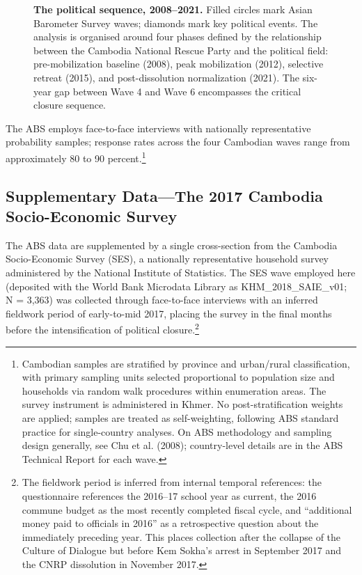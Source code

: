 \documentclass[Review,times,sageh,doublespace]{sagej}
\begin{document}
\begin{figure}[!htbp]
{%
}%
\caption{\textbf{The political sequence, 2008--2021.}
Filled circles mark Asian Barometer Survey waves; diamonds mark key political events.
The analysis is organised around four phases defined by the relationship between the
Cambodia National Rescue Party and the political field: pre-mobilization baseline (2008),
peak mobilization (2012), selective retreat (2015), and post-dissolution normalization (2021).
The six-year gap between Wave 4 and Wave 6 encompasses the critical closure sequence.}
\label{fig:timeline}
\end{figure}

The ABS employs face-to-face interviews with nationally representative
probability samples; response rates across the four Cambodian waves
range from approximately 80 to 90 percent.\footnote{Cambodian samples
  are stratified by province and urban/rural classification, with
  primary sampling units selected proportional to population size and
  households via random walk procedures within enumeration areas. The
  survey instrument is administered in Khmer. No post-stratification
  weights are applied; samples are treated as self-weighting, following
  ABS standard practice for single-country analyses. On ABS methodology
  and sampling design generally, see Chu et al. (2008); country-level
  details are in the ABS Technical Report for each wave.}

\subsection{Supplementary Data---The 2017 Cambodia Socio-Economic
Survey}\label{supplementary-datathe-2017-cambodia-socio-economic-survey}

The ABS data are supplemented by a single cross-section from the
Cambodia Socio-Economic Survey (SES), a nationally representative
household survey administered by the National Institute of Statistics.
The SES wave employed here (deposited with the World Bank Microdata
Library as KHM\_2018\_SAIE\_v01; N = 3,363) was collected through
face-to-face interviews with an inferred fieldwork period of
early-to-mid 2017, placing the survey in the final months before the
intensification of political closure.\footnote{The fieldwork period is
  inferred from internal temporal references: the questionnaire
  references the 2016--17 school year as current, the 2016 commune
  budget as the most recently completed fiscal cycle, and ``additional
  money paid to officials in 2016'' as a retrospective question about
  the immediately preceding year. This places collection after the
  collapse of the Culture of Dialogue but before Kem Sokha's arrest in
  September 2017 and the CNRP dissolution in November 2017.}
\end{document}
